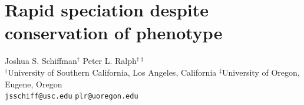 \documentclass{article}
\newcommand{\1}{\mathbbm{1}}
\begin{document}
\linenumbers

\section*{Rapid speciation despite conservation of phenotype}
{\centering
Joshua S. Schiffman$^{\dagger}$ \qquad Peter L. Ralph$^{\dagger \ddagger}$ \\
$^{\dagger}$University of Southern California, Los Angeles, California \qquad 
$^{\ddagger}$University of Oregon, Eugene, Oregon \\
\texttt{jsschiff@usc.edu} \qquad 
\texttt{plr@uoregon.edu}
\\
}

%
%
%
%
%
%
%
%
%
%
%
%
%
%
%
\end{document}
